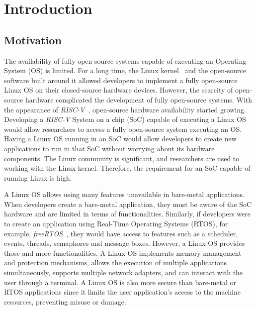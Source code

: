 
\section{Introduction}
\label{sec:intro}

\subsection{Motivation}

The availability of fully open-source systems capable of executing an Operating System (OS) is limited. For a long time, the Linux kernel~\cite{torvalds1997linux} and the open-source software built around it allowed developers
to implement a fully open-source Linux OS on their closed-source hardware devices. However, the scarcity of open-source hardware complicated the development of fully open-source systems. With the appearance of \textit{RISC-V}~\cite{asanovic2014instruction}, open-source hardware availability started growing. Developing a \textit{RISC-V} System on a chip (SoC) capable of executing a Linux OS would allow researchers to access a fully open-source system executing an OS. Having a Linux OS running in an SoC would allow developers to create new applications to run in that SoC without worrying about its hardware components. The Linux community is significant, and researchers are used to working with the Linux kernel. Therefore, the requirement for an SoC capable of running Linux is high. 

A Linux OS allows using many features unavailable in bare-metal applications. When developers create a bare-metal application, they must be aware of the SoC hardware and are limited in terms of functionalities. Similarly, if developers were to create an application using Real-Time Operating Systems (RTOS), for example, \textit{freeRTOS}~\cite{barry2008freertos}, they would have access to features such as a scheduler, events, threads, semaphores and message boxes. However, a Linux OS provides those and more functionalities. A Linux OS implements memory management and protection mechanisms, allows the execution of multiple applications simultaneously, supports multiple network adapters, and can interact with the user through a terminal. A Linux OS is also more secure than bare-metal or RTOS applications since it limits the user application's access to the machine resources, preventing misuse or damage.

